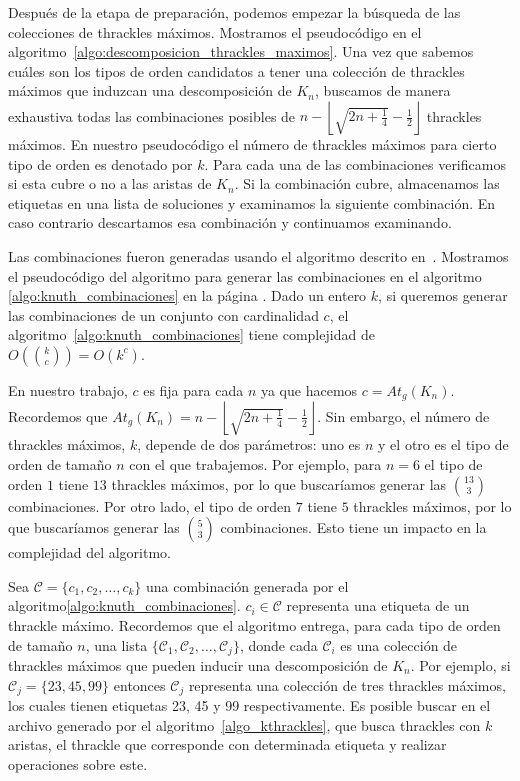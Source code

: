   Después de la etapa de preparación, podemos empezar la búsqueda de las colecciones de
  thrackles máximos. Mostramos el pseudocódigo en el
  algoritmo~\ref{algo:descomposicion_thrackles_maximos}. Una vez que sabemos cuáles son
  los tipos de orden candidatos a tener una colección de thrackles máximos que induzcan
  una descomposición de $K_n$, buscamos de manera exhaustiva todas las combinaciones
  posibles de $n -  \left\lfloor\sqrt{2n + \frac{1}{4}} - \frac{1}{2}\right\rfloor$
  thrackles máximos. En nuestro pseudocódigo el número de thrackles máximos para cierto
  tipo de orden es denotado por $k$. Para cada una de las combinaciones verificamos si esta cubre o no a las aristas de $K_n$. Si la combinación cubre, almacenamos las etiquetas en una lista
  de soluciones y examinamos la siguiente combinación. En caso contrario descartamos esa
  combinación y continuamos examinando.

  Las combinaciones fueron generadas usando el algoritmo descrito en~\cite{Knuth2011A}.
  Mostramos el pseudocódigo del algoritmo para generar las combinaciones en el algoritmo
  \ref{algo:knuth_combinaciones} en la página \pageref{algo:knuth_combinaciones}. Dado un
  entero $k$, si queremos generar las combinaciones de un conjunto con cardinalidad $c$, el
  algoritmo~\ref{algo:knuth_combinaciones} tiene complejidad de
  $O\left(\binom{k}{c}\right) = O(k^c)$.

  En nuestro trabajo, $c$ es fija para cada $n$ ya que hacemos $c = At_g(K_n)$.
  Recordemos que $At_g(K_n) = n - \left\lfloor\sqrt{2n+\frac{1}{4}} -
  \frac{1}{2}\right\rfloor$. Sin embargo, el número de thrackles máximos, $k$, depende de dos parámetros: uno es $n$ y el otro es el tipo de orden de tamaño $n$ con el que trabajemos. Por ejemplo, para $n=6$ el tipo de orden $1$ tiene $13$ thrackles máximos, por lo que buscaríamos generar las $\binom{13}{3}$ combinaciones. Por otro lado, el tipo de orden $7$ tiene $5$ thrackles
  máximos, por lo que buscaríamos generar las $\binom{5}{3}$ combinaciones. Esto tiene un
  impacto en la complejidad del algoritmo.

  Sea $\mathcal{C}=\{c_1,c_2,\dots,c_k\}$ una combinación generada por el algoritmo\ref{algo:knuth_combinaciones}. $c_i\in\mathcal{C}$ representa una etiqueta de un thrackle máximo. Recordemos que el algoritmo entrega, para cada tipo de orden de tamaño $n$, una lista
  $\{\mathcal{C}_1,\mathcal{C}_2,\dots,\mathcal{C}_j\}$, donde cada $\mathcal{C}_i$ es
  una colección de thrackles máximos que pueden inducir una descomposición de $K_n$. Por
  ejemplo, si $\mathcal{C}_j=\{23,45,99\}$ entonces $\mathcal{C}_j$ representa una
  colección de tres thrackles máximos, los cuales tienen etiquetas 23, 45 y 99
  respectivamente. Es posible buscar en el archivo generado por el
  algoritmo~\ref{algo_kthrackles}, que busca thrackles con $k$ aristas, el thrackle que
  corresponde con determinada etiqueta y realizar operaciones sobre este.

